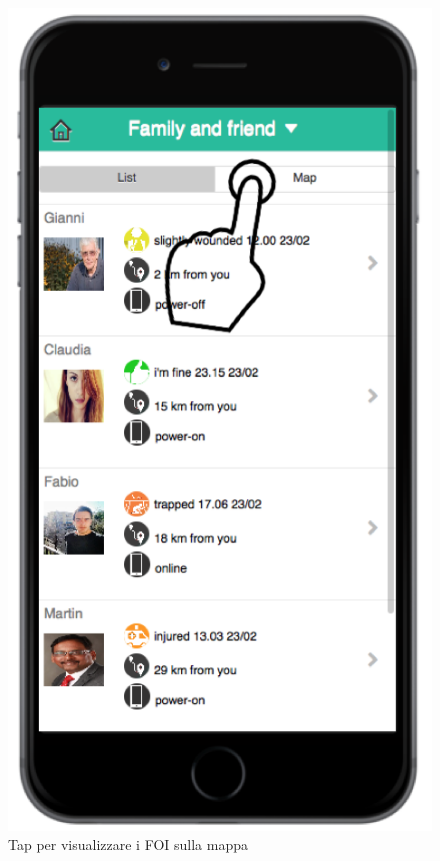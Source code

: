 \begin{itemize}
\begin{figure}[H]
	\centering
	\includegraphics[scale=1]{interfaccia/mapfoi.png}
	\caption{Tap per visualizzare i FOI sulla mappa }
	\label{fig:mapfoi}
\end{figure}
\begin{figure}[H]
	\centering

\end{figure}
\end{itemize}
